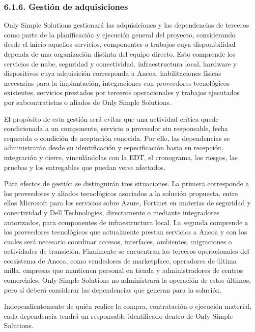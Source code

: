\documentclass[11pt]{article}
\begin{document}
\subsubsection{6.1.6. Gestión de adquisiciones}\label{6-1-6-gestion-de-adquisiciones}

Only Simple Solutions gestionará las adquisiciones y las dependencias de terceros como parte de la planificación y ejecución general del proyecto, considerando desde el inicio aquellos servicios, componentes o trabajos cuya disponibilidad dependa de una organización distinta del equipo directo. Esto comprende los servicios de nube, seguridad y conectividad, infraestructura local, hardware y dispositivos cuya adquisición corresponda a Ancoa, habilitaciones físicas necesarias para la implantación, integraciones con proveedores tecnológicos existentes, servicios prestados por terceros operacionales y trabajos ejecutados por subcontratistas o aliados de Only Simple Solutions.

El propósito de esta gestión será evitar que una actividad crítica quede
condicionada a un componente, servicio o proveedor sin responsable,
fecha requerida o condición de aceptación conocida. Por ello, las
dependencias se administrarán desde su identificación y especificación
hasta su recepción, integración y cierre, vinculándolas con la EDT, el
cronograma, los riesgos, las pruebas y los entregables que puedan verse
afectados.

Para efectos de gestión se distinguirán tres situaciones. La primera
corresponde a los proveedores y aliados tecnológicos asociados a la
solución propuesta, entre ellos Microsoft para los servicios sobre
Azure, Fortinet en materias de seguridad y conectividad y Dell
Technologies, directamente o mediante integradores autorizados, para
componentes de infraestructura local. La segunda comprende a los
proveedores tecnológicos que actualmente prestan servicios a Ancoa y con
los cuales será necesario coordinar accesos, interfaces, ambientes,
migraciones o actividades de transición. Finalmente se encuentran los
terceros operacionales del ecosistema de Ancoa, como vendedores de
marketplace, operadores de última milla, empresas que mantienen personal
en tienda y administradores de centros comerciales. Only Simple
Solutions no administrará la operación de estos últimos, pero sí deberá
considerar las dependencias que generan para la solución.

Independientemente de quién realice la compra, contratación o ejecución
material, cada dependencia tendrá un responsable identificado dentro de
Only Simple Solutions.
\end{document}

